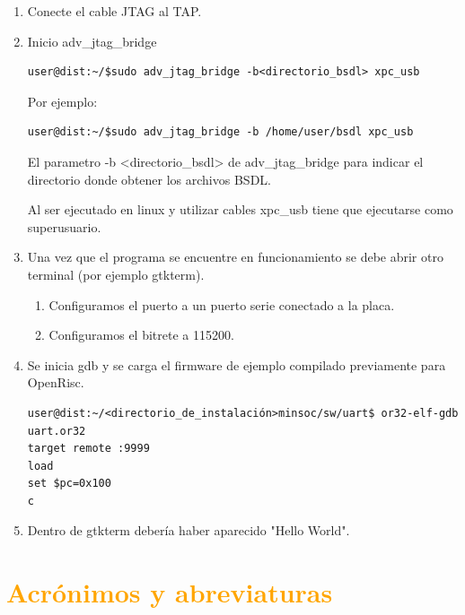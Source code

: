 \documentclass[a4paper,11pt]{article}
\begin{document}
\begin{enumerate}

\item Conecte el cable JTAG al TAP.
\item Inicio adv\_jtag\_bridge

\begin{verbatim}
user@dist:~/$sudo adv_jtag_bridge -b<directorio_bsdl> xpc_usb 
\end{verbatim}

Por ejemplo:

\begin{verbatim}
user@dist:~/$sudo adv_jtag_bridge -b /home/user/bsdl xpc_usb 
\end{verbatim}
El parametro -b <directorio\_bsdl> de adv\_jtag\_bridge para indicar el directorio donde obtener los archivos BSDL.

Al ser ejecutado en linux y utilizar cables xpc\_usb tiene que ejecutarse como superusuario.


\item Una vez que el programa se encuentre en funcionamiento se debe abrir otro terminal (por ejemplo gtkterm).
\begin{enumerate}


\item Configuramos el puerto a un puerto serie conectado a la placa.
\item Configuramos el bitrete a 115200.
\end{enumerate}

\item Se inicia gdb y se carga el firmware de ejemplo compilado previamente para OpenRisc.

\begin{verbatim}
user@dist:~/<directorio_de_instalación>minsoc/sw/uart$ or32-elf-gdb uart.or32
target remote :9999
load
set $pc=0x100
c
\end{verbatim}
\item Dentro de gtkterm debería haber aparecido "Hello World". 

 \end{enumerate} 


\newpage

\section{\textcolor{orange}{Acrónimos y abreviaturas}}
\end{document}
